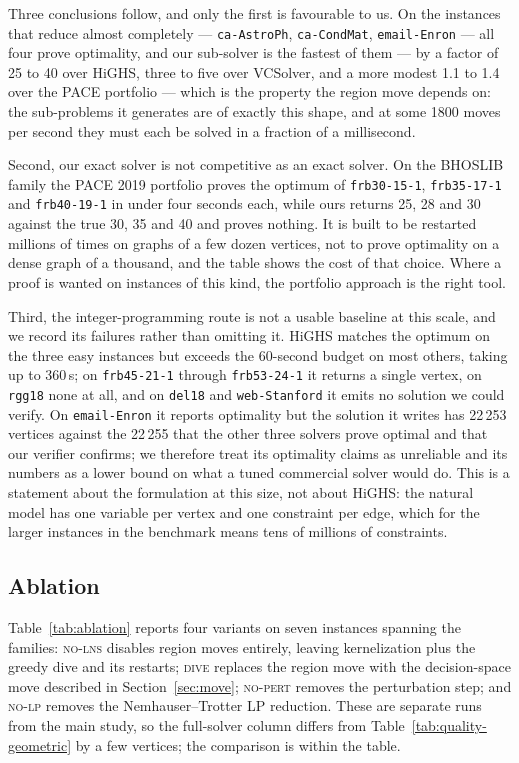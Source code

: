 \documentclass[preprint,12pt]{elsarticle}
\theoremstyle{definition}
\begin{document}
Three conclusions follow, and only the first is favourable to us. On the
instances that reduce almost completely --- \texttt{ca-AstroPh},
\texttt{ca-CondMat}, \texttt{email-Enron} --- all four prove optimality, and our
sub-solver is the fastest of them --- by a factor of 25 to 40 over HiGHS, three
to five over VCSolver, and a more modest 1.1 to 1.4 over the PACE portfolio ---
which is the property
the region move depends on: the sub-problems it generates are of exactly this
shape, and at some 1800 moves per second they must each be solved in a fraction
of a millisecond.

Second, our exact solver is not competitive as an exact solver. On the BHOSLIB
family the PACE 2019 portfolio proves the optimum of \texttt{frb30-15-1},
\texttt{frb35-17-1} and \texttt{frb40-19-1} in under four seconds each, while
ours returns 25, 28 and 30 against the true 30, 35 and 40 and proves nothing.
It is built to be restarted millions of times on graphs of a few dozen vertices,
not to prove optimality on a dense graph of a thousand, and the table shows the
cost of that choice. Where a proof is wanted on instances of this kind, the
portfolio approach is the right tool.

Third, the integer-programming route is not a usable baseline at this scale, and
we record its failures rather than omitting it. HiGHS matches the optimum on the
three easy instances but exceeds the 60-second budget on most others, taking up
to 360\,s; on \texttt{frb45-21-1} through \texttt{frb53-24-1} it returns a single
vertex, on \texttt{rgg18} none at all, and on \texttt{del18} and
\texttt{web-Stanford} it emits no solution we could verify. On
\texttt{email-Enron} it reports optimality but the solution it writes has 22\,253
vertices against the 22\,255 that the other three solvers prove optimal and that
our verifier confirms; we therefore treat its optimality claims as unreliable
and its numbers as a lower bound on what a tuned commercial solver would do.
This is a statement about the formulation at this size, not about HiGHS: the
natural model has one variable per vertex and one constraint per edge, which for
the larger instances in the benchmark means tens of millions of constraints.



\subsection{Ablation}
\label{sec:ablation}

Table~\ref{tab:ablation} reports four variants on seven instances spanning the
families: \textsc{no-lns} disables region moves entirely, leaving kernelization
plus the greedy dive and its restarts; \textsc{dive} replaces the region move
with the decision-space move described in Section~\ref{sec:move}; \textsc{no-pert}
removes the perturbation step; and \textsc{no-lp} removes the
Nemhauser--Trotter LP reduction. These are separate runs from the main study, so
the full-solver column differs from Table~\ref{tab:quality-geometric} by a few
vertices; the comparison is within the table.
\end{document}
